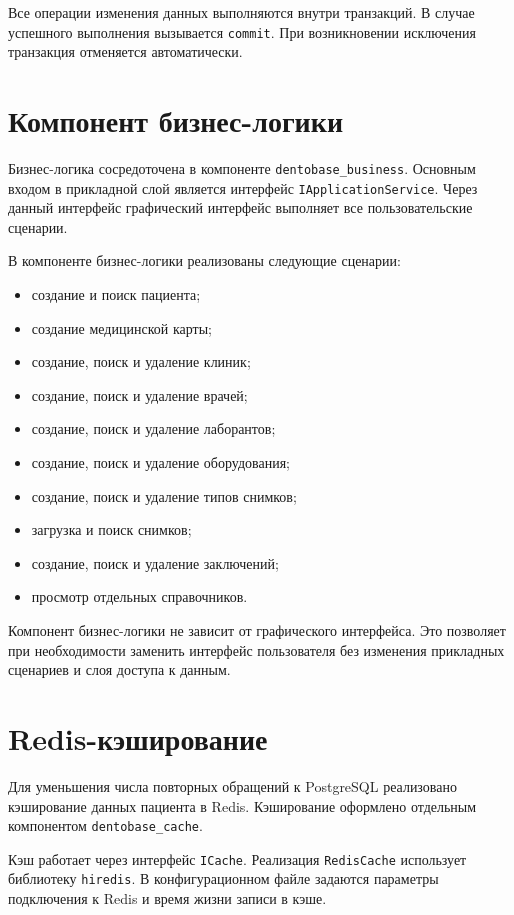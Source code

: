 Все операции изменения данных выполняются внутри транзакций. В случае успешного выполнения вызывается \texttt{commit}. При возникновении исключения транзакция отменяется автоматически.

\section{Компонент бизнес-логики}

Бизнес-логика сосредоточена в компоненте \texttt{dentobase\_business}. Основным входом в прикладной слой является интерфейс \texttt{IApplicationService}. Через данный интерфейс графический интерфейс выполняет все пользовательские сценарии.

В компоненте бизнес-логики реализованы следующие сценарии:

\begin{itemize}
	\item создание и поиск пациента;
	\item создание медицинской карты;
	\item создание, поиск и удаление клиник;
	\item создание, поиск и удаление врачей;
	\item создание, поиск и удаление лаборантов;
	\item создание, поиск и удаление оборудования;
	\item создание, поиск и удаление типов снимков;
	\item загрузка и поиск снимков;
	\item создание, поиск и удаление заключений;
	\item просмотр отдельных справочников.
\end{itemize}

Компонент бизнес-логики не зависит от графического интерфейса. Это позволяет при необходимости заменить интерфейс пользователя без изменения прикладных сценариев и слоя доступа к данным.

\section{Redis-кэширование}

Для уменьшения числа повторных обращений к PostgreSQL реализовано кэширование данных пациента в Redis. Кэширование оформлено отдельным компонентом \texttt{dentobase\_cache}.

Кэш работает через интерфейс \texttt{ICache}. Реализация \texttt{RedisCache} использует библиотеку \texttt{hiredis}. В конфигурационном файле задаются параметры подключения к Redis и время жизни записи в кэше.


